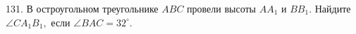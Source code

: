131. В остроугольном треугольнике $ABC$ провели высоты $AA_1$ и $BB_1.$ Найдите $\angle CA_1B_1,$ если $\angle BAC=32^\circ.$\\
